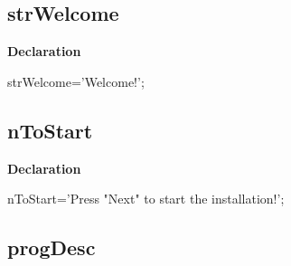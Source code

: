 \documentclass{report}
\newif\ifpdf
\begin{document}
\subsection*{strWelcome}
\fi
\label{trstrings-strWelcome}
\begin{list}{}{
\setlength{\itemindent}{0cm}
\setlength{\listparindent}{0cm}
\setlength{\leftmargin}{\evensidemargin}
\addtolength{\leftmargin}{\tmplength}
\settowidth{\labelsep}{X}
\addtolength{\leftmargin}{\labelsep}
\setlength{\labelwidth}{\tmplength}
}
\item[\textbf{Declaration}\hfill]
\ifpdf
\begin{flushleft}
\fi
\begin{ttfamily}
strWelcome='Welcome!';\end{ttfamily}

\ifpdf
\end{flushleft}
\fi

\end{list}
\ifpdf
\subsection*{\large{\textbf{nToStart}}\normalsize\hspace{1ex}\hrulefill}
\else
\subsection*{nToStart}
\fi
\label{trstrings-nToStart}
\begin{list}{}{
\setlength{\itemindent}{0cm}
\setlength{\listparindent}{0cm}
\setlength{\leftmargin}{\evensidemargin}
\addtolength{\leftmargin}{\tmplength}
\settowidth{\labelsep}{X}
\addtolength{\leftmargin}{\labelsep}
\setlength{\labelwidth}{\tmplength}
}
\item[\textbf{Declaration}\hfill]
\ifpdf
\begin{flushleft}
\fi
\begin{ttfamily}
nToStart='Press "Next" to start the installation!';\end{ttfamily}

\ifpdf
\end{flushleft}
\fi

\end{list}
\ifpdf
\subsection*{\large{\textbf{progDesc}}\normalsize\hspace{1ex}\hrulefill}
\else
\end{document}
